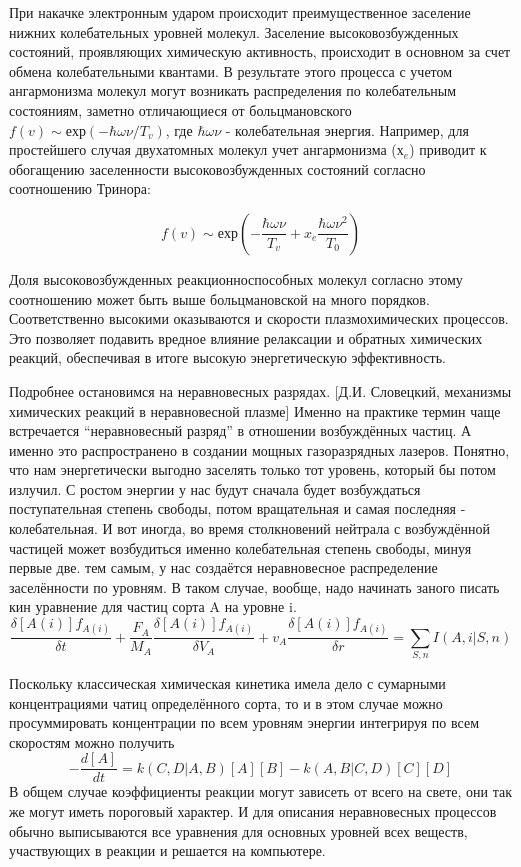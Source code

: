\documentclass[10pt, a4paper]{article}
\begin{document}
При накачке электронным ударом происходит преимущественное заселение нижних колебательных уровней молекул. Заселение высоковозбужденных состояний, проявляющих химическую активность, происходит в основном за счет обмена колебательными квантами. В результате этого процесса с учетом ангармонизма молекул могут возникать распределения по колебательным состояниям, заметно отличающиеся от больцмановского $f(v) \sim ехр(-\hbar \omega \nu / T_v)$, где $\hbar \omega \nu$ - колебательная энергия. Например, для простейшего случая двухатомных молекул учет ангармонизма ($х_e$) приводит к обогащению заселенности высоковозбужденных состояний согласно соотношению Тринора:

\begin{equation}
  f(v) \sim ехр(-\frac{\hbar \omega \nu} {T_v}+x_e\frac{\hbar \omega \nu^{2}}{T_0})
\end{equation}

Доля высоковозбужденных реакционноспособных молекул согласно этому соотношению может быть выше больцмановской на много порядков. Соответственно высокими оказываются и скорости плазмохимических процессов. Это позволяет подавить вредное влияние релаксации и обратных химических реакций, обеспечивая в итоге высокую энергетическую эффективность. 

Подробнее остановимся на неравновесных разрядах. [Д.И. Словецкий, механизмы химических реакций в неравновесной плазме]
Именно на практике термин чаще встречается “неравновесный разряд” в отношении возбуждённых частиц. А именно это распространено в создании мощных газоразрядных лазеров. Понятно, что нам энергетически выгодно заселять только тот уровень, который бы потом излучил. С ростом энергии у нас будут сначала будет возбуждаться поступательная степень свободы, потом вращательная и самая последняя - колебательная. И вот иногда, во время столкновений нейтрала с возбуждённой частицей может возбудиться именно колебательная степень свободы, минуя первые две. тем самым, у нас создаётся неравновесное распределение заселённости по уровням.
В таком случае, вообще, надо начинать заного писать кин уравнение для частиц сорта A на уровне i.
\begin{equation}
\frac{\delta [A(i)] f_{A(i)}}{\delta t}+\frac{F_A}{M_A}\frac{\delta [A(i)] f_{A(i)}}{\delta V_A} +v_A \frac{\delta [A(i)] f_{A(i)}}{\delta r}=\sum_{S,n} I(A,i|S,n) 
\end{equation}

Поскольку классическая химическая кинетика имела дело с сумарными концентрациями чатиц определённого сорта, то и в этом случае можно просуммировать концентрации по всем уровням энергии интегрируя по всем скоростям можно получить
 \begin{equation}
-\frac{d [A] }{dt}=k(C,D|A,B) [A][B]-k(A,B|C,D) [C][D]
\end{equation}
В общем случае коэффициенты реакции могут зависеть от всего на свете, они так же могут иметь пороговый характер. И для описания неравновесных процессов обычно выписываются все уравнения для основных уровней всех веществ, участвующих в реакции и решается на компьютере.
\end{document}
